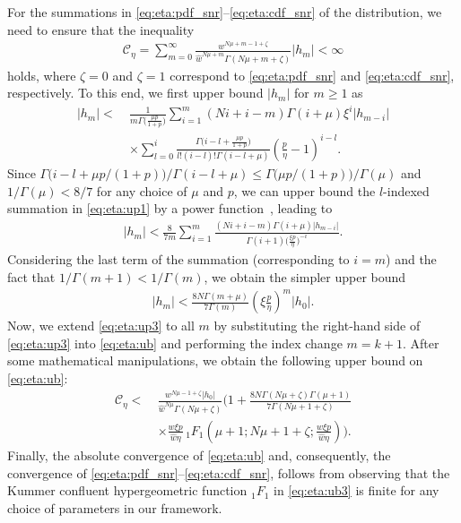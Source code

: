 \documentclass[journal,twocolumn]{IEEEtran}
\begin{document}
For the summations in \eqref{eq:eta:pdf_snr}--\eqref{eq:eta:cdf_snr} of the \Ehm{} distribution, we need to ensure that the inequality
\begin{align} \label{eq:eta:ub}
   \mathcal{C}_{\eta} = \sum_{m=0}^{\infty}\frac{w^{N \mu + m-1+\zeta}}{\hat{w} ^{N \mu + m}\Gamma (N \mu + m +\zeta)} \left|h_m\right| < \infty
\end{align}
holds, where $\zeta = 0$ and $\zeta = 1$ correspond to \eqref{eq:eta:pdf_snr} and \eqref{eq:eta:cdf_snr}, respectively. To this end, we first upper bound $\left|h_m\right|$ for $m\geq 1$ as
\begin{align} \label{eq:eta:up1}
    \left| h_m\right| < \ & \frac{1}{m \Gamma \big(\frac{\mu  p}{1+p}\big)} \sum _{i=1}^m (N i +i-m) \Gamma(i+\mu) \xi^i \left|h_{m-i}\right| \nonumber \\
    & \times \sum _{l=0}^i\frac{\Gamma \big(i-l+\frac{\mu p }{1+p}\big)}{l! (i-l)! \Gamma (i-l+\mu )} \left(\frac{p}{\eta }-1\right)^{i-l}.
\end{align}
Since $\Gamma\big(i-l+\mu p/(1+p)\big)/\Gamma(i-l+\mu) \leq \Gamma\big(\mu p/(1+p)\big)/\Gamma(\mu)$ and $1/\Gamma(\mu) < 8/7$ for any choice of $\mu$ and $p$, we can upper bound the $l$-indexed summation in \eqref{eq:eta:up1} by a power function~\cite[Eq.~(1.111)]{Gra07}, leading to  
\begin{align} \label{eq:eta:up2}
    \left| h_m\right| < \frac{8}{7 m} \sum _{i=1}^m  \frac{ (N i+i-m)\Gamma\left(i+
    \mu\right) \left|h_{m-i}\right|}{\Gamma(i+1) \big(\frac{\xi p}{\eta}\big)^{-i}}. 
\end{align}
Considering the last term of the summation (corresponding to $i = m$) and the fact that $1/\Gamma(m+1) < 1/\Gamma(m)$, we obtain the simpler upper bound 
\begin{align} \label{eq:eta:up3}
    | h_m| < \frac{8 N \Gamma(m+\mu)}{7 \Gamma(m)} \left(\xi\frac{p}{\eta}\right)^m \left|h_{0}\right|.
\end{align}
Now, we extend \eqref{eq:eta:up3} to all $m$ by substituting the right-hand side of \eqref{eq:eta:up3} into \eqref{eq:eta:ub} and performing the index change $m = k + 1$. After some mathematical manipulations, we obtain the following upper bound on \eqref{eq:eta:ub}:
\begin{align}
    \mathcal{C}_{\eta} < \ & 
    \frac{w^{N \mu-1+\zeta} |h_0| }{\hat{w} ^{N \mu}\Gamma( N\mu+\zeta)} \bigg(1 +\frac{8 N \Gamma (N\mu+\zeta) \Gamma (\mu +1)}{7 \Gamma (N \mu +1+\zeta)} \nonumber \\
    & \times \frac{w \xi  p}{\hat{w} \eta } \, _1F_1\left(\mu +1;N \mu+1+\zeta;\frac{w \xi  p}{\hat{w} \eta }\right)\bigg). \label{eq:eta:ub3}
\end{align}
Finally, the absolute convergence of \eqref{eq:eta:ub} and, consequently, the convergence of \eqref{eq:eta:pdf_snr}--\eqref{eq:eta:cdf_snr}, follows from observing that the Kummer confluent hypergeometric function $_1F_1$ in \eqref{eq:eta:ub3} is finite for any choice of parameters in our framework.
\end{document}

